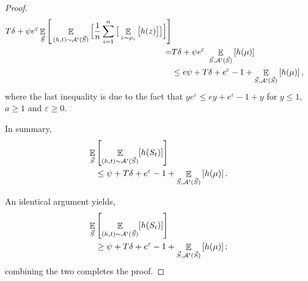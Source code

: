 \documentclass[12pt,a4paper,oneside,onecolumn]{book}
\begin{document}
{\begin{proof}
\begin{align*}
      T\delta + 
      \psi e^\varepsilon
      \mathop{\mathbb{E}}_{\vec{S}}\Bigg[
      \mathop{\mathbb{E}}_{(h,t)\sim\mathcal{A}'(\vec{S})} 
        \Big[ \frac{1}{n}\sum_{i=1}^n
        \big[
      \mathop{\mathbb{E}}_{z\sim \mu_i}\big[      
      h(z)
      \big]
      \big]    
      \Big]
      \Bigg] \\
    =&
    T\delta + 
      \psi e^\varepsilon\
      \mathop{\mathbb{E}}_{\vec{S},\mathcal{A}'(\vec{S})}\left[ 
      h(\mu)
      \right] \\
    &\leq
      e\psi + T\delta +  e^\varepsilon - 1 + 
      \mathop{\mathbb{E}}_{\vec{S},\mathcal{A}'(\vec{S})}\left[ 
      h(\mu)
      \right],       
  \end{align*}
  where the last inequality is due to the fact that
  $ye^\varepsilon \leq ey + e^\varepsilon - 1 + y$
  for $y\leq 1$, $a \geq 1$ and $\varepsilon \geq 0$.

In summary,
  \begin{align*}
    \mathop{\mathbb{E}}_{\vec{S}} &
    \left[
      \mathop{\mathbb{E}}_{(h,t)\sim\mathcal{A}'(\vec{S})}[h(S_t)]
    \right] \\
    &\leq
    \psi + T\delta +  e^\varepsilon - 1 + 
    \mathop{\mathbb{E}}_{\vec{S},\mathcal{A}'(\vec{S})}\left[ 
      h(\mu)
    \right].       
  \end{align*}

An identical argument yields,
  \begin{align*}
    \mathop{\mathbb{E}}_{\vec{S}} &
    \left[
      \mathop{\mathbb{E}}_{(h,t)\sim\mathcal{A}'(\vec{S})}[h(S_t)]
    \right] \\
    &\geq
    \psi + T\delta +  e^\varepsilon - 1 + 
    \mathop{\mathbb{E}}_{\vec{S},\mathcal{A}'(\vec{S})}\left[ 
      h(\mu)
    \right];       
  \end{align*}
  combining the two completes the proof.
\end{proof}
}%
\end{document}

